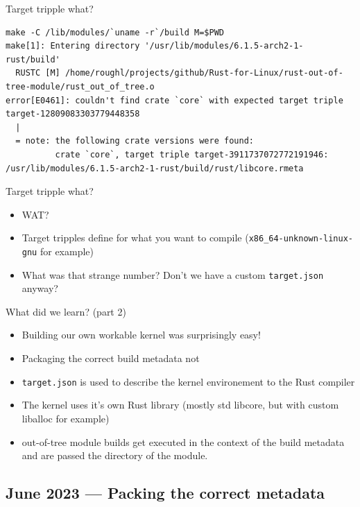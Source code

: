 \begin{frame}[c,fragile]{Target tripple what?}
  \begin{verbatim}
make -C /lib/modules/`uname -r`/build M=$PWD
make[1]: Entering directory '/usr/lib/modules/6.1.5-arch2-1-rust/build'
  RUSTC [M] /home/roughl/projects/github/Rust-for-Linux/rust-out-of-tree-module/rust_out_of_tree.o
error[E0461]: couldn't find crate `core` with expected target triple target-12809083303779448358
  |
  = note: the following crate versions were found:
          crate `core`, target triple target-3911737072772191946: /usr/lib/modules/6.1.5-arch2-1-rust/build/rust/libcore.rmeta
  \end{verbatim}
\end{frame}

\begin{frame}[c,fragile]{Target tripple what?}
  \begin{itemize}
    \item WAT?
    \item Target tripples define for what you want to compile
      (\texttt{x86\_64-unknown-linux-gnu} for example)
    \item What was that strange number? Don't we have a custom
      \texttt{target.json} anyway?
  \end{itemize}
\end{frame}

\begin{frame}[c]{What did we learn? (part 2)}
  \small
  \begin{itemize}
    \item Building our own workable kernel was surprisingly easy!
    \item Packaging the correct build metadata not
    \item \texttt{target.json} is used to describe the kernel environement to
      the Rust compiler
    \item The kernel uses it's own Rust library (mostly std libcore, but with
      custom liballoc for example)
    \item out-of-tree module builds get executed in the context of the build
      metadata and are passed the directory of the module.
  \end{itemize}
\end{frame}

\subsection{June 2023 — Packing the correct metadata}

